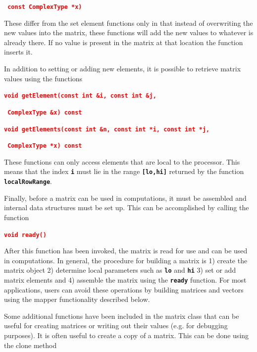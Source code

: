 \documentclass[12pt]{report} %
\begin{document}
\textcolor{red}{\texttt{\textbf{                 const ComplexType *x)}}}

\textcolor{red}{\texttt{\textbf{}}}

These differ from the set element functions only in that instead of overwriting the new values into the matrix, these functions will add the new values to whatever is already there. If no value is present in the matrix at that location the function inserts it.

In addition to setting or adding new elements, it is possible to retrieve matrix values using the functions

\textcolor{red}{\texttt{\textbf{void getElement(const int \&i, const int \&j,}}}

\textcolor{red}{\texttt{\textbf{                ComplexType \&x) const}}}

\textcolor{red}{\texttt{\textbf{}}}

\textcolor{red}{\texttt{\textbf{void getElements(const int \&n, const int *i, const int *j,}}}

\textcolor{red}{\texttt{\textbf{                 ComplexType *x) const}}}

These functions can only access elements that are local to the processor. This means that the index \texttt{\textbf{i}} must lie in the range \texttt{\textbf{[lo,hi]}} returned by the function \texttt{\textbf{localRowRange}}.

Finally, before a matrix can be used in computations, it must be assembled and internal data structures must be set up. This can be accomplished by calling the function

\textcolor{red}{\texttt{\textbf{void ready()}}}

After this function has been invoked, the matrix is read for use and can be used in computations. In general, the procedure for building a matrix is 1) create the matrix object 2) determine local parameters such as \texttt{\textbf{lo}} and \texttt{\textbf{hi}} 3) set or add matrix elements and 4) assemble the matrix using the \texttt{\textbf{ready}} function. For most applications, users can avoid these operations by building matrices and vectors using the mapper functionality described below.

Some additional functions have been included in the matrix class that can be useful for creating matrices or writing out their values (e.g. for debugging purposes). It is often useful to create a copy of a matrix. This can be done using the clone method
\end{document}
